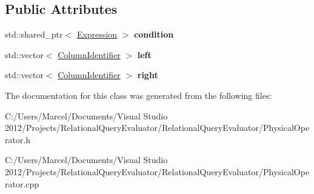 \subsection*{Public Attributes}
\begin{DoxyCompactItemize}
\item 
\hypertarget{class_hash_anti_join_a94f542040c9ee014a520ddf0b9267ff2}{std\+::shared\+\_\+ptr$<$ \hyperlink{class_expression}{Expression} $>$ {\bfseries condition}}\label{class_hash_anti_join_a94f542040c9ee014a520ddf0b9267ff2}

\item 
\hypertarget{class_hash_anti_join_a87f91c29c85463c75c10539e0239d63a}{std\+::vector$<$ \hyperlink{class_column_identifier}{Column\+Identifier} $>$ {\bfseries left}}\label{class_hash_anti_join_a87f91c29c85463c75c10539e0239d63a}

\item 
\hypertarget{class_hash_anti_join_a3f41da2aa9eff3bad59eef69b0f4486b}{std\+::vector$<$ \hyperlink{class_column_identifier}{Column\+Identifier} $>$ {\bfseries right}}\label{class_hash_anti_join_a3f41da2aa9eff3bad59eef69b0f4486b}

\end{DoxyCompactItemize}


The documentation for this class was generated from the following files\+:\begin{DoxyCompactItemize}
\item 
C\+:/\+Users/\+Marcel/\+Documents/\+Visual Studio 2012/\+Projects/\+Relational\+Query\+Evaluator/\+Relational\+Query\+Evaluator/Physical\+Operator.\+h\item 
C\+:/\+Users/\+Marcel/\+Documents/\+Visual Studio 2012/\+Projects/\+Relational\+Query\+Evaluator/\+Relational\+Query\+Evaluator/Physical\+Operator.\+cpp\end{DoxyCompactItemize}
